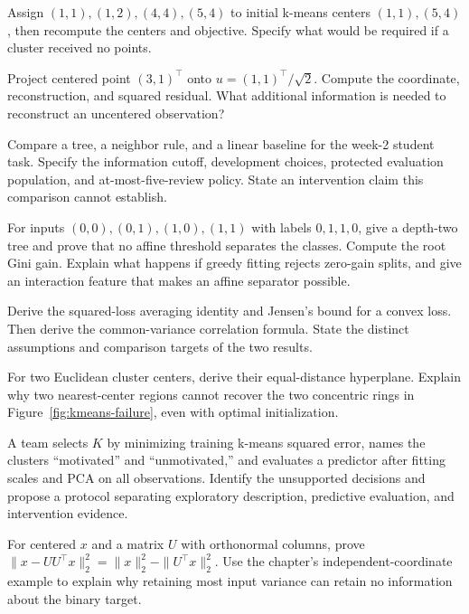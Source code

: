 \begin{exercises}
\item {}Assign $(1,1),(1,2),(4,4),(5,4)$ to initial k-means centers $(1,1),(5,4)$, then recompute the centers and objective. Specify what would be required if a cluster received no points.
\item {}Project centered point $(3,1)^\top$ onto $u=(1,1)^\top/\sqrt2$. Compute the coordinate, reconstruction, and squared residual. What additional information is needed to reconstruct an uncentered observation?
\item {}Compare a tree, a neighbor rule, and a linear baseline for the week-2 student task. Specify the information cutoff, development choices, protected evaluation population, and at-most-five-review policy. State an intervention claim this comparison cannot establish.
\end{exercises}

\par\noindent\begin{minipage}{\linewidth}
\begin{challengeexercises}
\item {}For inputs $(0,0),(0,1),(1,0),(1,1)$ with labels $0,1,1,0$, give a depth-two tree and prove that no affine threshold separates the classes. Compute the root Gini gain. Explain what happens if greedy fitting rejects zero-gain splits, and give an interaction feature that makes an affine separator possible.
\item {}Derive the squared-loss averaging identity and Jensen's bound for a convex loss. Then derive the common-variance correlation formula. State the distinct assumptions and comparison targets of the two results.
\item {}For two Euclidean cluster centers, derive their equal-distance hyperplane. Explain why two nearest-center regions cannot recover the two concentric rings in Figure~\ref{fig:kmeans-failure}, even with optimal initialization.
\item {}A team selects $K$ by minimizing training k-means squared error, names the clusters ``motivated'' and ``unmotivated,'' and evaluates a predictor after fitting scales and PCA on all observations. Identify the unsupported decisions and propose a protocol separating exploratory description, predictive evaluation, and intervention evidence.
\item {}For centered $x$ and a matrix $U$ with orthonormal columns, prove $\|x-UU^\top x\|_2^2=\|x\|_2^2-\|U^\top x\|_2^2$. Use the chapter's independent-coordinate example to explain why retaining most input variance can retain no information about the binary target.
\end{challengeexercises}
\end{minipage}
\clearpage
\begingroup\pagestyle{empty}\cleardoublepage\endgroup
\endgroup

